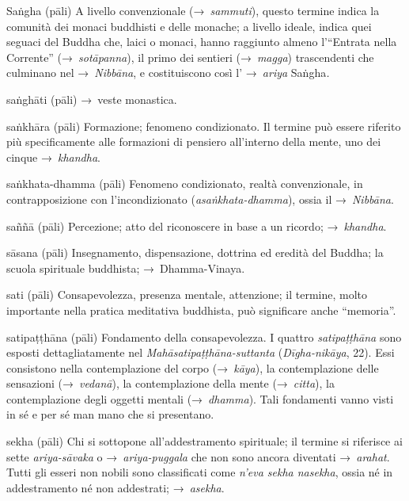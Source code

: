 \begin{glossarydescription}
\item[Saṅgha] (pāli) A livello convenzionale (→~\emph{sammuti}), questo termine
  indica la comunità dei monaci buddhisti e delle monache; a livello ideale,
  indica quei seguaci del Buddha che, laici o monaci, hanno raggiunto almeno
  l'``Entrata nella Corrente'' (→~\emph{sotāpanna}), il primo dei sentieri
  (→~\emph{magga}) trascendenti che culminano nel →~\emph{Nibbāna}, e
  costituiscono così l' →~\emph{ariya} Saṅgha\emph{.}

\item[saṅghāti] (pāli) →~veste monastica.

\item[saṅkhāra] (pāli) Formazione; fenomeno condizionato. Il termine può essere
  riferito più specificamente alle formazioni di pensiero all'interno della
  mente, uno dei cinque →~\emph{khandha}.

\item[saṅkhata-dhamma] (pāli) Fenomeno condizionato, realtà convenzionale, in
  contrapposizione con l'incondizionato (\emph{asaṅkhata-dhamma}), ossia il
  →~\emph{Nibbāna}.

\item[saññā] (pāli) Percezione; atto del riconoscere in base a un ricordo;
  →~\emph{khandha}.

\item[sāsana] (pāli) Insegnamento, dispensazione, dottrina ed eredità del
  Buddha; la scuola spirituale buddhista; →~Dhamma-Vinaya.

\item[sati] (pāli) Consapevolezza, presenza mentale, attenzione; il termine,
  molto importante nella pratica meditativa buddhista, può significare anche
  ``memoria''.

\item[satipaṭṭhāna] (pāli)\label{glossary-satipatthana} Fondamento della consapevolezza. I quattro
  \emph{satipaṭṭhāna} sono esposti dettagliatamente nel
  \emph{Mahāsatipaṭṭhāna-suttanta} (\emph{Dīgha-nikāya}, 22). Essi consistono
  nella contemplazione del corpo (→~\emph{kāya}), la contemplazione delle
  sensazioni (→~\emph{vedanā}), la contemplazione della mente (→~\emph{citta}),
  la contemplazione degli oggetti mentali (→~\emph{dhamma}). Tali fondamenti
  vanno visti in sé e per sé man mano che si presentano.

\item[sekha] (pāli) Chi si sottopone all'addestramento spirituale; il termine si
  riferisce ai sette \emph{ariya-sāvaka} o →~\emph{ariya-puggala} che non sono
  ancora diventati →~\emph{arahat}. Tutti gli esseri non nobili sono
  classificati come \emph{n'eva sekha nasekha}, ossia né in addestramento né non
  addestrati; →~\emph{asekha}.


\end{glossarydescription}
